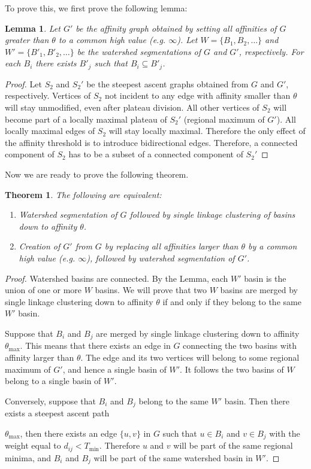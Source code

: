 \documentclass{article}
\newtheorem{lemma}{Lemma}
\newtheorem{theorem}{Theorem}
\begin{document}
To prove this, we first prove the following lemma:
\begin{lemma}
  Let $G'$ be the affinity graph obtained by setting all affinities of
  $G$ greater than $\theta$ to a common high value (e.g. $\infty$).
  Let $W=\{B_1,B_2,\dots\}$ and $W'=\{B'_1,B'_2,\dots\}$ be the
  watershed segmentations of $G$ and $G'$, respectively.  For each
  $B_i$ there exists $B'_j$ such that $B_i \subseteq B'_j$.
\end{lemma}

\begin{proof}
Let $S_2$ and $S_2'$ be the steepest ascent graphs obtained from $G$
and $G'$, respectively.  Vertices of $S_2$ not incident to any edge
with affinity smaller than $\theta$ will stay unmodified, even after
plateau division. All other vertices of $S_2$ will become part of a
locally maximal plateau of $S_2'$ (regional maximum of $G'$). All
locally maximal edges of $S_2$ will stay locally maximal. Therefore
the only effect of the affinity threshold is to introduce
bidirectional edges. Therefore, a connected component of $S_2$ has to
be a subset of a connected component of $S_2'$
\end{proof}

Now we are ready to prove the following theorem.
\begin{theorem}
The following are equivalent:
\begin{enumerate}
\item Watershed segmentation of $G$ followed by single linkage clustering of basins down to affinity $\theta$.
\item Creation of $G'$ from $G$ by replacing all affinities larger
  than $\theta$ by a common high value (e.g. $\infty$), followed by
  watershed segmentation of $G'$.
\end{enumerate}
\end{theorem}

\begin{proof}
Watershed basins are connected. By the Lemma, each $W'$ basin is the
union of one or more $W$ basins. We will prove that two $W$ basins are
merged by single linkage clustering down to affinity $\theta$ if and
only if they belong to the same $W'$ basin.

Suppose that $B_i$ and $B_j$ are merged by single linkage clustering
down to affinity $\theta_{\max}$.  This means that there exists an
edge in $G$ connecting the two basins with affinity larger than
$\theta$. The edge and its two vertices will belong to some regional
maximum of $G'$, and hence a single basin of $W'$.  It follows the two
basins of $W$ belong to a single basin of $W'$.

Conversely, suppose that $B_i$ and $B_j$ belong to the same $W'$
basin.  Then there exists a steepest ascent path

$\theta_{\max}$, then there exists an edge $\{u,v\}$ in $G$ such that
$u \in B_i$ and $v \in B_j$ with the weight equal to $d_{ij} <
T_{\min}$. Therefore $u$ and $v$ will be part of the same regional
minima, and $B_i$ and $B_j$ will be part of the same watershed basin
in $W'$.
\end{proof}
\end{document}
